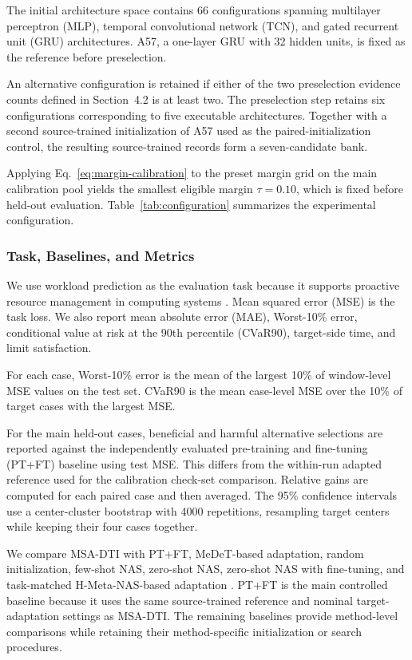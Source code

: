 \documentclass[a4paper,fleqn]{cas-sc}
\begin{document}
The initial architecture space contains 66 configurations spanning multilayer
perceptron (MLP), temporal convolutional network (TCN), and gated recurrent
unit (GRU) architectures. A57, a one-layer GRU with 32 hidden units, is fixed
as the reference before preselection.

An alternative configuration is retained if either of the two preselection
evidence counts defined in Section~4.2 is at least two. The preselection step retains six configurations corresponding to five executable
architectures. Together with a second source-trained initialization of A57 used
as the paired-initialization control, the resulting source-trained records form
a seven-candidate bank.

Applying Eq.~\eqref{eq:margin-calibration} to the preset margin grid on the
main calibration pool yields the smallest eligible margin $\tau=0.10$, which
is fixed before held-out evaluation. Table~\ref{tab:configuration}
summarizes the experimental configuration.



\subsubsection{Task, Baselines, and Metrics}

We use workload prediction as the evaluation task because it supports
proactive resource management in computing systems
\cite{ref17,ref18,ref19}. Mean squared error (MSE) is the task loss. We also
report mean absolute error (MAE), Worst-10\% error, conditional value at risk
at the 90th percentile (CVaR90), target-side time, and limit satisfaction.

For each case, Worst-10\% error is the mean of the largest 10\% of window-level
MSE values on the test set. CVaR90 is the mean case-level MSE over the 10\% of
target cases with the largest MSE.

For the main held-out cases, beneficial and harmful alternative selections
are reported against the independently evaluated pre-training and fine-tuning
(PT+FT) baseline using test MSE. This differs from the within-run adapted
reference used for the calibration check-set comparison. Relative gains are
computed for each paired case and then averaged. The 95\% confidence intervals
use a center-cluster bootstrap with 4000 repetitions, resampling target centers
while keeping their four cases together.

We compare MSA-DTI with PT+FT, MeDeT-based adaptation, random
initialization, few-shot NAS, zero-shot NAS, zero-shot NAS with fine-tuning,
and task-matched H-Meta-NAS-based adaptation
\cite{ref30}. PT+FT is the main controlled baseline because it uses the
same source-trained reference and nominal target-adaptation settings as
MSA-DTI. The remaining baselines provide method-level comparisons while retaining their
method-specific initialization or search procedures.
\end{document}
